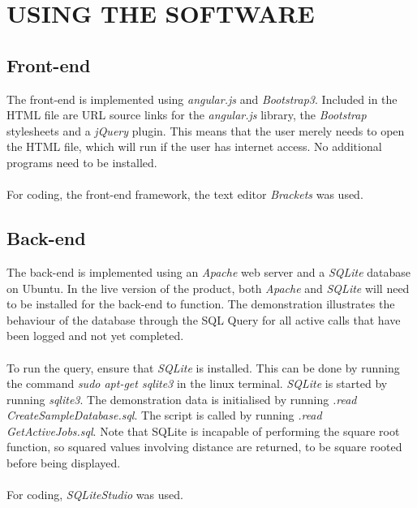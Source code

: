 \documentclass[10pt,twocolumn]{witseiepaper}
\begin{document}
\section{USING THE SOFTWARE}
\subsection{Front-end}
The front-end is implemented using \textit{angular.js} and \textit{Bootstrap3}. Included in the HTML file are URL source links for the \textit{angular.js} library, the \textit{Bootstrap} stylesheets and a \textit{jQuery} plugin. This means that the user merely needs to open the HTML file, which will run if the user has internet access. No additional programs need to be installed.\\ \\
For coding, the front-end framework, the text editor \textit{Brackets} was used.

\subsection{Back-end}
The back-end is implemented using an \textit{Apache} web server and a \textit{SQLite} database on Ubuntu. In the live version of the product, both \textit{Apache} and \textit{SQLite} will need to be installed for the back-end to function. The demonstration illustrates the behaviour of the database through the SQL Query for all active calls that have been logged and not yet completed.
\\ \\
To run the query, ensure that \textit{SQLite} is installed. This can be done by running the command \textit{sudo apt-get sqlite3} in the linux terminal. \textit{SQLite} is started by running \textit{sqlite3}. The demonstration data is initialised by running \textit{.read CreateSampleDatabase.sql}. The script is called by running \textit{.read GetActiveJobs.sql}. Note that SQLite is incapable of performing the square root function, so squared values involving distance are returned, to be square rooted before being displayed.
\\ \\
For coding, \textit{SQLiteStudio} was used.
%


\end{document}
